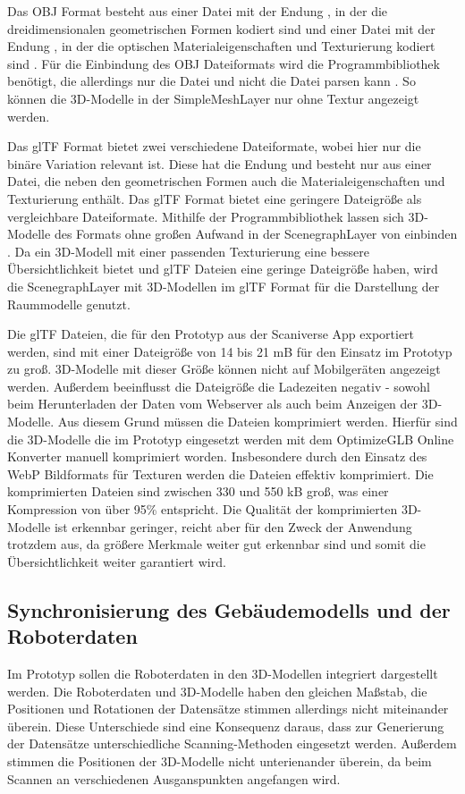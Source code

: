 Das \ac{OBJ} Format besteht aus einer Datei mit der Endung \obj{}, in der die dreidimensionalen geometrischen Formen kodiert sind \cite{OBJSpec} und einer Datei mit der Endung \mtl{}, in der die optischen Materialeigenschaften und Texturierung kodiert sind \cite{MTLSpec}. Für die Einbindung des \ac{OBJ} Dateiformats wird die \loadersgl{} Programmbibliothek benötigt, die allerdings nur die \obj{} Datei und nicht die \mtl{} Datei parsen kann \cite{OBJLoader}. So können die 3D-Modelle in der SimpleMeshLayer nur ohne Textur angezeigt werden.

Das \ac{glTF} Format bietet zwei verschiedene Dateiformate, wobei hier nur die binäre Variation relevant ist. Diese hat die Endung \glb{} und besteht nur aus einer Datei, die neben den geometrischen Formen auch die Materialeigenschaften und Texturierung enthält. Das \ac{glTF} Format bietet eine geringere Dateigröße als vergleichbare Dateiformate.\cite[Abschnitt 2]{glTFSpec} Mithilfe der \loadersgl{} Programmbibliothek lassen sich 3D-Modelle des Formats ohne großen Aufwand in der ScenegraphLayer von \deckgl{} einbinden \cite{DeckglScenegraphLayer}. Da ein 3D-Modell mit einer passenden Texturierung eine bessere Übersichtlichkeit bietet und \ac{glTF} Dateien eine geringe Dateigröße haben, wird die ScenegraphLayer mit 3D-Modellen im \ac{glTF} Format für die Darstellung der Raummodelle genutzt.

Die \ac{glTF} Dateien, die für den Prototyp aus der Scaniverse App exportiert werden, sind mit einer Dateigröße von 14 bis 21 \ac{mB} für den Einsatz im Prototyp zu groß. 3D-Modelle mit dieser Größe können nicht auf Mobilgeräten angezeigt werden. Außerdem beeinflusst die Dateigröße die Ladezeiten negativ - sowohl beim Herunterladen der Daten vom Webserver als auch beim Anzeigen der 3D-Modelle. Aus diesem Grund müssen die Dateien komprimiert werden. Hierfür sind die 3D-Modelle die im Prototyp eingesetzt werden mit dem OptimizeGLB Online Konverter manuell komprimiert worden. Insbesondere durch den Einsatz des \ac{WebP} Bildformats für Texturen werden die Dateien effektiv komprimiert.\cite{OptimizeGLB} Die komprimierten Dateien sind zwischen 330 und 550 \ac{kB} groß, was einer Kompression von über 95\% entspricht. Die Qualität der komprimierten 3D-Modelle ist erkennbar geringer, reicht aber für den Zweck der Anwendung trotzdem aus, da größere Merkmale weiter gut erkennbar sind und somit die Übersichtlichkeit weiter garantiert wird.

\subsection{Synchronisierung des Gebäudemodells und der Roboterdaten}
Im Prototyp sollen die Roboterdaten in den 3D-Modellen integriert dargestellt werden. Die Roboterdaten und 3D-Modelle haben den gleichen Maßstab, die Positionen und Rotationen der Datensätze stimmen allerdings nicht miteinander überein. Diese Unterschiede sind eine Konsequenz daraus, dass zur Generierung der Datensätze unterschiedliche Scanning-Methoden eingesetzt werden. Außerdem stimmen die Positionen der 3D-Modelle nicht unterienander überein, da beim Scannen an verschiedenen Ausganspunkten angefangen wird.

